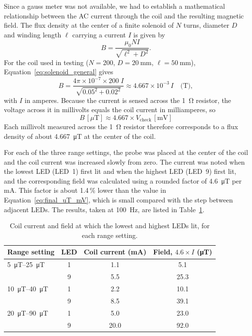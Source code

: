 \documentclass[11pt,a4paper]{article}
\begin{document}
Since a gauss meter was not available, we had to establish a mathematical relationship between the AC current through the coil and the resulting magnetic field. The flux density at the center of a finite solenoid of $N$ turns, diameter $D$ and winding length $\ell$ carrying a current $I$ is given by~\cite{griffiths2013}
\begin{equation}
  B = \frac{\mu_0 N I}{\sqrt{\ell^{2} + D^{2}}}.
  \label{eq:solenoid_general}
\end{equation}
For the coil used in testing ($N = 200$, $D = \SI{20}{\milli\meter}$, $\ell = \SI{50}{\milli\meter}$), Equation~\ref{eq:solenoid_general} gives
\begin{equation}
  B = \frac{4\pi\times10^{-7}\times 200\; I}{\sqrt{0.05^{2} + 0.02^{2}}}
    \approx 4.667\times10^{-3}\, I \quad \text{(T)},
\end{equation}
with $I$ in amperes. Because the current is sensed across the \SI{1}{\ohm} resistor, the voltage across it in millivolts equals the coil current in milliamperes, so
\begin{equation}
  \boxed{B\,[\mu\mathrm{T}] \approx 4.667 \times V_{\mathrm{check}}\,[\mathrm{mV}]}
  \label{eq:final_uT_mV}
\end{equation}
Each millivolt measured across the \SI{1}{\ohm} resistor therefore corresponds to a flux density of about \SI{4.667}{\micro\tesla} at the center of the coil.

For each of the three range settings, the probe was placed at the center of the coil and the coil current was increased slowly from zero. The current was noted when the lowest LED (LED~1) first lit and when the highest LED (LED~9) first lit, and the corresponding field was calculated using a rounded factor of \SI{4.6}{\micro\tesla} per \si{\milli\ampere}. This factor is about 1.4\,\% lower than the value in Equation~\ref{eq:final_uT_mV}, which is small compared with the step between adjacent LEDs. The results, taken at \SI{100}{\hertz}, are listed in Table~\ref{tab:measurements}.

\begin{table}[H]
  \centering
  \caption{Coil current and field at which the lowest and highest LEDs lit, for each range setting.}
  \label{tab:measurements}
  \small
  \begin{tabular}{@{}lccc@{}}
    \toprule
    Range setting & LED & Coil current (mA) & Field, $4.6\times I$ (\si{\micro\tesla}) \\
    \midrule
    \SIrange{5}{25}{\micro\tesla}  & 1 & 1.1  & 5.1  \\
                                   & 9 & 5.5  & 25.3 \\
    \SIrange{10}{40}{\micro\tesla} & 1 & 2.2  & 10.1 \\
                                   & 9 & 8.5  & 39.1 \\
    \SIrange{20}{90}{\micro\tesla} & 1 & 5.0  & 23.0 \\
                                   & 9 & 20.0 & 92.0 \\
    \bottomrule
  \end{tabular}
\end{table}
\end{document}
